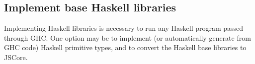 \subsection{Implement base Haskell libraries}

Implementing Haskell libraries is necessary to run any Haskell program passed 
through GHC. One option may be to implement (or automatically generate from GHC code) Haskell
primitive types, and to convert the Haskell base libraries to JSCore.

\begin{comment}
\subsection{Map GHC encoded Types to Haskell-Python}

Figure out how to create encoded types for Haskell-Python. It may be possible to
autogenerate these from GHC files.

"2.) understanding how GHC encodes types. The Core Haskell of the previous steps encodes the types of all functions in slightly low-level
ways. This needs to be understood and a mapping of these types to what
the Python Haskell interpreter provides needs to be written." 

\subsection{Set up GHC test environment for Haskell-Python}

Setting up the GHC test enviromnent for Haskell-Python would be very valuable
for development and bug fixing.

"3.) the actual interpretation of the Core language is mostly
implemented. There are probably some things missing, which will be
discovered by running some Haskell programs. For that end, it would be
good to find out whether there is a Haskell implementation test suite
and get it to run."

\subsection{Add built in Haskell types to run some Haskell benchmarks}

"4.) what is missing to run more non-pure Haskell programs are all the
built-in functions (e.g. those that perform arithmetic, I/O, call C
functions, etc) and built-in types (e.g. integers, floats, C-level types
like arrays and structs). These should be added step by step. This is an
essentially open-ended task. It would be good to add as many built-ins
so that some of the Haskell benchmarks can run."


\end{comment}
